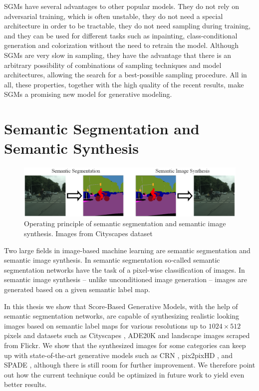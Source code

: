 \thispagestyle{plain}
SGMs have several advantages to other popular models. They do not rely on adversarial training, which is often unstable, they do not need a special architecture in order to be tractable, they do not need sampling during training, and they can be used for different tasks such as inpainting, class-conditional generation and colorization without the need to retrain the model. Although SGMs are very slow in sampling, they have the advantage that there is an arbitrary possibility of combinations of sampling techniques and model architectures, allowing the search for a best-possible sampling procedure. All in all, these properties, together with the high quality of the recent results, make SGMs a promising new model for generative modeling.
\section{Semantic Segmentation and Semantic Synthesis} 
\thispagestyle{plain}
%
\begin{figure}[h!]
    \centering
    \includegraphics[width=1\textwidth]{Chapters/figures/sem_seg_vs_sem_synth.PNG}
    \caption[Operating principle of semantic segmentation and semantic image synthesis]{Operating principle of semantic segmentation and semantic image synthesis. Images from Cityscapes dataset \cite{cityscapes}}
\end{figure}
%
Two large fields in image-based machine learning are semantic segmentation and semantic image synthesis. In semantic segmentation so-called semantic segmentation networks have the task of a pixel-wise classification of images. In semantic image synthesis – unlike unconditioned image generation \cite{score_3} – images are generated based on a given semantic label map.

In this thesis we show that Score-Based Generative Models, with the help of semantic segmentation networks, are capable of synthesizing realistic looking images based on semantic label maps for various resolutions up to $1024\times512$ pixels and datasets such as Cityscapes \cite{cityscapes}, ADE20K \cite{ade20k} and landscape images scraped from Flickr. We show that the synthesized images for some categories can keep up with state-of-the-art generative models such as CRN \cite{crn}, pix2pixHD \cite{pix2pixHD}, and SPADE \cite{spade}, although there is still room for further improvement. We therefore point out how the current technique could be optimized in future work to yield even better results. 

